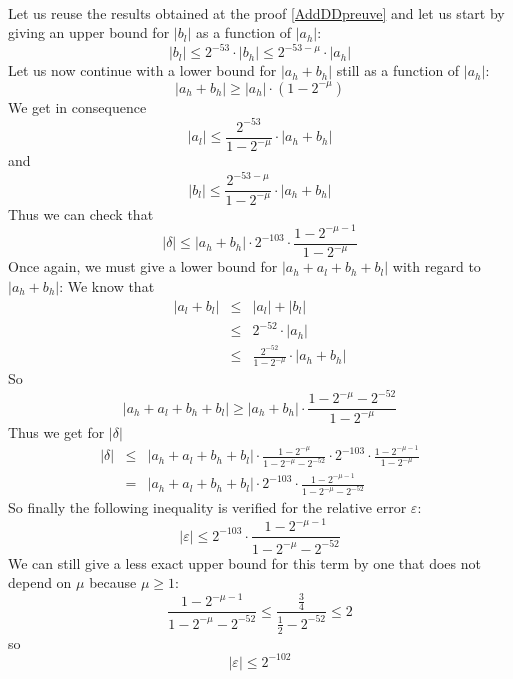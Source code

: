 \documentclass[a4paper,10pt,twoside]{article}
\newenvironment{proof}[1][Proof]{\begin{trivlist}
\item[\hskip \labelsep {\bfseries #1}]}{\end{trivlist}}
\newcommand{\qed}{\nobreak \ifvmode \relax \else \ifdim \lastskip<1.5em \hskip-\lastskip
\hskip1.5em plus0em minus0.5em \fi \nobreak \vrule height0.75em width0.5em depth0.25em\fi}
\newcommand{\hi}{\ensuremath{\mathit{h}}}
\newcommand{\lo}{\ensuremath{\mathit{l}}}
\renewcommand{\epsilon}{\varepsilon}
\begin{document}
\begin{proof} ~ \\
Let us reuse the results obtained at the proof \ref{AddDDpreuve} and let us
start by giving an upper bound for $\left \vert b_\lo \right \vert$
as a function of $\left \vert a_\hi  \right \vert$:
$$\left \vert b_\lo \right \vert \leq 2^{-53} \cdot \left \vert b_\hi \right \vert \leq 2^{-53-\mu} \cdot \left \vert a_\hi \right \vert$$
Let us now continue with a lower bound for $\left \vert a_\hi + b_\hi \right
\vert$ still as a function of $\left \vert a_\hi \right \vert$:
$$\left \vert a_\hi + b_\hi \right \vert \geq \left \vert a_\hi \right \vert \cdot \left( 1 - 2^{-\mu} \right)$$
We get in consequence
$$\left \vert a_\lo \right \vert \leq \frac{2^{-53}}{1-2^{-\mu}} \cdot \left \vert a_\hi + b_\hi \right \vert$$
and
$$\left \vert b_\lo \right \vert \leq \frac{2^{-53-\mu}}{1-2^{-\mu}} \cdot \left \vert a_\hi + b_\hi \right \vert$$
Thus we can check that
$$\left \vert \delta \right \vert \leq \left \vert a_\hi + b_\hi \right \vert \cdot 2^{-103} \cdot \frac{1-2^{-\mu-1}}{1-2^{-\mu}}$$
Once again, we must give a lower bound for $\left \vert a_\hi + a_\lo + b_\hi
  + b_\lo \right \vert$
with regard to $\left \vert a_\hi + b_\hi \right \vert$:
We know that
\begin{eqnarray*}
\left \vert a_\lo + b_\lo \right \vert & \leq & \left \vert a_\lo \right \vert + \left \vert b_\lo \right \vert \\
& \leq & 2^{-52} \cdot \left \vert a_\hi \right \vert \\
& \leq & \frac{2^{-52}}{1-2^{-\mu}} \cdot \left \vert a_\hi + b_\hi \right \vert
\end{eqnarray*}
So
$$\left \vert a_\hi + a_\lo + b_\hi + b_\lo \right \vert \geq \left \vert a_\hi + b_\hi \right \vert \cdot \frac{1-2^{-\mu}-2^{-52}}{1-2^{-\mu}}$$
Thus we get for $\left \vert \delta \right \vert$
\begin{eqnarray*}
\left \vert \delta \right \vert & \leq & \left \vert a_\hi + a_\lo + b_\hi + b_\lo \right \vert \cdot \frac{1-2^{-\mu}}{1-2^{-\mu}-2^{-52}} \cdot
2^{-103} \cdot \frac{1-2^{-\mu-1}}{1-2^{-\mu}} \\
& = & \left \vert a_\hi + a_\lo + b_\hi + b_\lo \right \vert \cdot 2^{-103} \cdot \frac{1-2^{-\mu-1}}{1-2^{-\mu}-2^{-52}}
\end{eqnarray*}
So finally the following inequality is verified for the relative error $\epsilon$:
$$\left \vert \epsilon \right \vert \leq 2^{-103} \cdot \frac{1-2^{-\mu-1}}{1-2^{-\mu}-2^{-52}}$$
We can still give a less exact upper bound for this term by one that does not
depend on $\mu$ because $\mu \geq 1$:
$$\frac{1-2^{-\mu-1}}{1-2^{-\mu}-2^{-52}}\leq\frac{\frac{3}{4}}{\frac{1}{2}-2^{-52}}\leq 2$$
so
$$\left \vert \epsilon \right \vert \leq 2^{-102}$$\qed
\end{proof}
\end{document}
